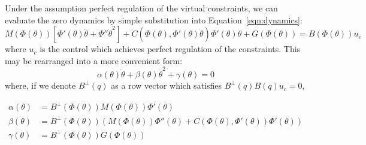 Under the assumption perfect regulation of the virtual constraints, we can evaluate the zero dynamics by simple substitution into Equation~\ref{eqn:dynamics}:
\begin{equation*}
	M\left(\Phi(\theta)\right)\left[\Phi'(\theta)\ddot{\theta} + \Phi''\dot{\theta}^2\right] + 
	C\left(\Phi(\theta),\Phi'(\theta)\dot{\theta}\right)\Phi'(\theta)\dot{\theta} +
	G\left(\Phi(\theta)\right) = B\left(\Phi(\theta)\right)u_c
\end{equation*}
where $u_c$ is the control which achieves perfect regulation of the constraints. This may be rearranged into a more convenient form:
\begin{equation} \label{eqn:zerodyn}
	\alpha(\theta)\ddot{\theta} + \beta(\theta)\dot{\theta}^2 + \gamma(\theta) = 0
\end{equation}
where, if we denote $B^{\perp}(q)$ as a row vector which satisfies $B^{\perp}(q)B(q)u_c = 0$,
\addtocounter{equation}{-1}
\begin{subequations}
\begin{align}
	\alpha(\theta) &= B^{\bot}\left(\Phi(\theta)\right)M\left(\Phi(\theta)\right)\Phi'(\theta) \\
	\beta(\theta) &= B^{\bot}\left(\Phi(\theta)\right)\left(M\left(\Phi(\theta)\right)\Phi''(\theta)
		+C\left(\Phi(\theta),\Phi'(\theta)\right)\Phi'(\theta) \right) \\
	\gamma(\theta) &= B^{\bot}\left(\Phi(\theta)\right)G\left(\Phi(\theta)\right)
\end{align}
\end{subequations}

